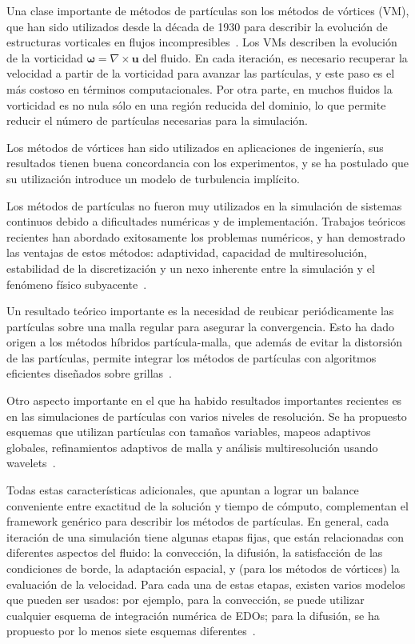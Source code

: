 \documentclass[11pt,spanish]{article}
\newcommand{\vel}{\mathbf{u}}
\newcommand{\vort}{\mathbf{\omega}}
\begin{document}
Una clase importante de métodos de partículas son los métodos de vórtices (VM),
que han sido utilizados desde la década de 1930 para describir la evolución de
estructuras vorticales en flujos incompresibles~\cite[\S2.2]{multiscale}.  Los
VMs describen la evolución de la vorticidad $\vort = \nabla\times\vel$ del
fluido.  En cada iteración, es necesario recuperar la velocidad a partir de la
vorticidad para avanzar las partículas, y este paso es el más costoso en
términos computacionales.  Por otra parte, en muchos fluidos la vorticidad es
no nula sólo en una región reducida del dominio, lo que permite reducir el
número de partículas necesarias para la simulación.

Los métodos de vórtices han sido utilizados en aplicaciones de ingeniería,
sus resultados tienen buena concordancia con los experimentos, y se ha postulado
que su utilización introduce un modelo de turbulencia implícito.

Los métodos de partículas no fueron muy utilizados en la simulación de sistemas
continuos debido a dificultades numéricas y de implementación.  Trabajos
teóricos recientes han abordado exitosamente los problemas numéricos, y han
demostrado las ventajas de estos métodos:  adaptividad, capacidad de
multiresolución, estabilidad de la discretización y un nexo inherente entre
la simulación y el fenómeno físico subyacente~\cite{ppm}.

Un resultado teórico importante es la necesidad de reubicar periódicamente
las partículas sobre una malla regular para asegurar la convergencia.  Esto ha
dado origen a los métodos híbridos partícula-malla, que además de evitar la
distorsión de las partículas, permite integrar los métodos de partículas con
algoritmos eficientes diseñados sobre grillas~\cite[\S3]{multiscale}.

Otro aspecto importante en el que ha habido resultados importantes recientes es
en las simulaciones de partículas con varios niveles de resolución.
Se ha propuesto esquemas que utilizan
partículas con tamaños variables,
mapeos adaptivos globales,
refinamientos adaptivos de malla
y análisis multiresolución usando wavelets~\cite{multiresolution}.

Todas estas características adicionales, que apuntan a lograr un balance
conveniente entre exactitud de la solución y tiempo de cómputo, complementan el
framework genérico para describir los métodos de partículas.  En general, cada
iteración de una simulación tiene algunas etapas fijas, que están relacionadas
con diferentes aspectos del fluido: la convección, la difusión, la satisfacción
de las condiciones de borde, la adaptación espacial, y (para los métodos de
vórtices) la evaluación de la velocidad.  Para cada una de estas etapas, existen
varios modelos que pueden ser usados:  por ejemplo, para la convección, se puede
utilizar cualquier esquema de integración numérica de EDOs;  para la difusión,
se ha propuesto por lo menos siete esquemas diferentes~\cite[\S1.2]{barba}.
\end{document}
